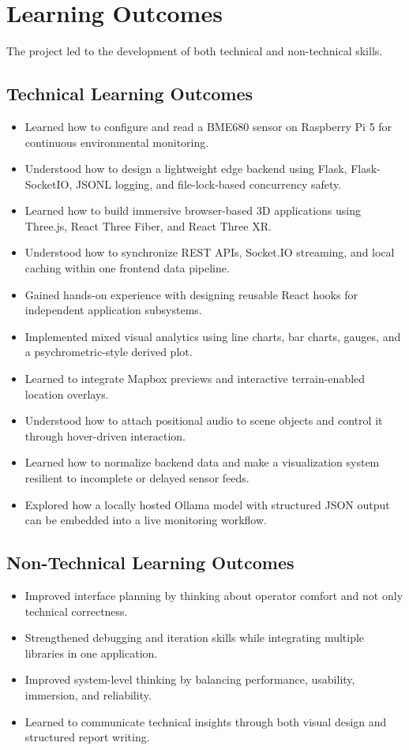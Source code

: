 \documentclass[conference]{IEEEtran}
\begin{document}
\section{Learning Outcomes}
The project led to the development of both technical and non-technical skills.

\subsection{Technical Learning Outcomes}
\begin{itemize}
\item Learned how to configure and read a BME680 sensor on Raspberry Pi 5 for continuous environmental monitoring.
\item Understood how to design a lightweight edge backend using Flask, Flask-SocketIO, JSONL logging, and file-lock-based concurrency safety.
\item Learned how to build immersive browser-based 3D applications using Three.js, React Three Fiber, and React Three XR.
\item Understood how to synchronize REST APIs, Socket.IO streaming, and local caching within one frontend data pipeline.
\item Gained hands-on experience with designing reusable React hooks for independent application subsystems.
\item Implemented mixed visual analytics using line charts, bar charts, gauges, and a psychrometric-style derived plot.
\item Learned to integrate Mapbox previews and interactive terrain-enabled location overlays.
\item Understood how to attach positional audio to scene objects and control it through hover-driven interaction.
\item Learned how to normalize backend data and make a visualization system resilient to incomplete or delayed sensor feeds.
\item Explored how a locally hosted Ollama model with structured JSON output can be embedded into a live monitoring workflow.
\end{itemize}

\subsection{Non-Technical Learning Outcomes}
\begin{itemize}
\item Improved interface planning by thinking about operator comfort and not only technical correctness.
\item Strengthened debugging and iteration skills while integrating multiple libraries in one application.
\item Improved system-level thinking by balancing performance, usability, immersion, and reliability.
\item Learned to communicate technical insights through both visual design and structured report writing.
\end{itemize}
\end{document}
